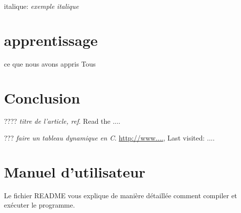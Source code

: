 \documentclass[11pt,a4paper]{article}
\begin{document}
italique: \textit{exemple italique}

\section{apprentissage}
ce que nous avons appris
Tous

\section{Conclusion}



\begin{thebibliography}{20}

????			%
\textit{titre de l'article, ref}.	%
Read the ....										%

???			%
\textit{faire un tableau dynamique en C}.					    %
\url{http://www....},	%
Last visited: ....								%
\end{thebibliography}




\appendix 
\renewcommand{\thesubsection}{\Alph{section}.\arabic{subsection}}

\section{Manuel d'utilisateur} \label{app:annexe}
Le fichier README vous explique de manière détaillée comment compiler et exécuter le programme.


\end{document}
